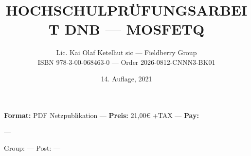\documentclass[a4paper,12pt]{article}
\title{HOCHSCHULPRÜFUNGSARBEIT DNB — MOSFETQ}
\author{Lic. Kai Olaf Ketelhut sic — Fieldberry Group\\ISBN 978-3-00-068463-0 — Order 2026-0812-CNNN3-BK01}
\date{14. Auflage, 2021}
\begin{document}
\maketitle

\textbf{Format:} PDF Netzpublikation — \textbf{Preis:} 21,00€ +TAX — \textbf{Pay:} \BunqPay

\QUBITS — \PageZero

\matrixcover

\vspace{5mm}
Group: \SantBerkGroup — Post: \SantBerkPost — \evergreen
\end{document}
